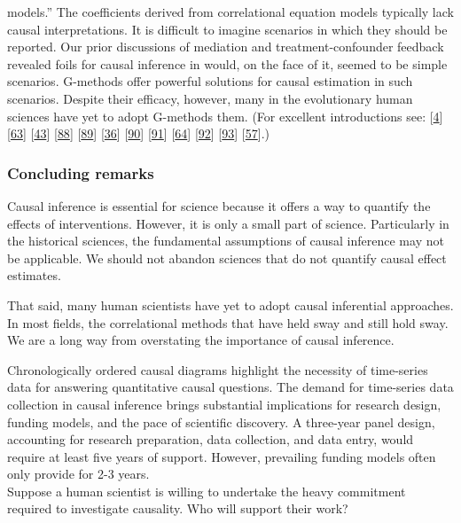\documentclass[
  singlecolumn]{article}
\begin{document}
\begin{enumerate}
  models.'' The coefficients derived from correlational equation models
  typically lack causal interpretations. It is difficult to imagine
  scenarios in which they should be reported. Our prior discussions of
  mediation and treatment-confounder feedback revealed foils for causal
  inference in would, on the face of it, seemed to be simple scenarios.
  G-methods offer powerful solutions for causal estimation in such
  scenarios. Despite their efficacy, however, many in the evolutionary
  human sciences have yet to adopt G-methods them. (For excellent
  introductions see: {[}\protect\hyperlink{ref-hernuxe1n2023}{4}{]}
  {[}\protect\hyperlink{ref-duxedaz2021}{63}{]}
  {[}\protect\hyperlink{ref-vanderweele2015}{43}{]}
  {[}\protect\hyperlink{ref-hoffman2022}{88}{]}
  {[}\protect\hyperlink{ref-hoffman2023}{89}{]}
  {[}\protect\hyperlink{ref-chatton2020}{36}{]}
  {[}\protect\hyperlink{ref-shiba2021}{90}{]}
  {[}\protect\hyperlink{ref-sjuxf6lander2016}{91}{]}
  {[}\protect\hyperlink{ref-breskin2020}{64}{]}
  {[}\protect\hyperlink{ref-vanderweele2009a}{92}{]}
  {[}\protect\hyperlink{ref-vansteelandt2012}{93}{]}
  {[}\protect\hyperlink{ref-shi2021}{57}{]}.)
\end{enumerate}

\hypertarget{concluding-remarks}{%
\subsubsection{Concluding remarks}\label{concluding-remarks}}

Causal inference is essential for science because it offers a way to
quantify the effects of interventions. However, it is only a small part
of science. Particularly in the historical sciences, the fundamental
assumptions of causal inference may not be applicable. We should not
abandon sciences that do not quantify causal effect estimates.

That said, many human scientists have yet to adopt causal inferential
approaches. In most fields, the correlational methods that have held
sway and still hold sway. We are a long way from overstating the
importance of causal inference.

Chronologically ordered causal diagrams highlight the necessity of
time-series data for answering quantitative causal questions. The demand
for time-series data collection in causal inference brings substantial
implications for research design, funding models, and the pace of
scientific discovery. A three-year panel design, accounting for research
preparation, data collection, and data entry, would require at least
five years of support. However, prevailing funding models often only
provide for 2-3 years.\\
Suppose a human scientist is willing to undertake the heavy commitment
required to investigate causality. Who will support their work?
\end{document}
